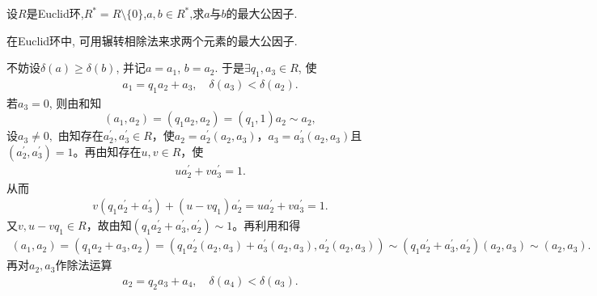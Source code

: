 \documentclass[../../main.tex]{subfiles}%
\begin{document}
\begin{proposition}[辗转相除法]
设$R$是Euclid环,$R^*=R\setminus \{0\}$,$a,b\in R^*$,求$a$与$b$的最大公因子.
\end{proposition}
\begin{note}
在Euclid环中, 可用辗转相除法来求两个元素的最大公因子.
\end{note}
\begin{solution}
不妨设$\delta(a)\geqslant\delta(b)$, 并记$a=a_1$, $b=a_2$. 于是$\exists q_1,a_3\in R$, 使
\begin{align*}
a_1=q_1a_2+a_3,\quad \delta(a_3)<\delta(a_2).
\end{align*}
若$a_3=0$, 则由和知
$$
(a_1,a_2)=\left( q_1a_2,a_2 \right) =\left( q_1,1 \right) a_2\sim a_2,
$$
设$a_3\neq 0,$
由知存在$a_{2}^{\prime},a_{3}^{\prime}\in R$，使$a_2=a_{2}^{\prime}(a_2,a_3)$，$a_3=a_{3}^{\prime}(a_2,a_3)$且$(a_{2}^{\prime},a_{3}^{\prime})=1$。再由知存在$u,v\in R$，使
\begin{align*}
ua_{2}^{\prime}+va_{3}^{\prime}=1.
\end{align*}
从而
\begin{align*}
v(q_1a_{2}^{\prime}+a_{3}^{\prime})+(u-vq_1)a_{2}^{\prime}=ua_{2}^{\prime}+va_{3}^{\prime}=1.
\end{align*}
又$v,u-vq_1\in R$，故由知$(q_1a_{2}^{\prime}+a_{3}^{\prime},a_{2}^{\prime})\sim 1$。再利用和得
\begin{align*}
(a_1,a_2)=(q_1a_2+a_3,a_2)=(q_1a_{2}^{\prime}(a_2,a_3)+a_{3}^{\prime}(a_2,a_3),a_{2}^{\prime}(a_2,a_3))\sim (q_1a_{2}^{\prime}+a_{3}^{\prime},a_{2}^{\prime})(a_2,a_3)\sim (a_2,a_3).
\end{align*}
再对$a_2,a_3$作除法运算
\begin{align*}
a_2=q_2a_3+a_4,\quad \delta(a_4)<\delta(a_3).
\end{align*}


\end{solution}
\end{document}
